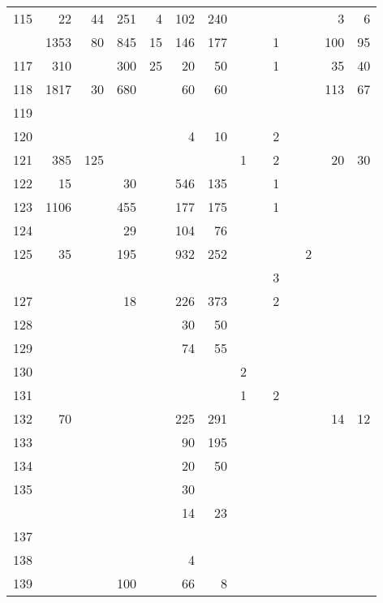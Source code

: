 \documentclass[
]{article}
\begin{document}
\begin{longtable}[l]{rrrrrrrrrrrrrr}
\rowcolor{lightgray}  115 & 22 & 44 & 251 & 4 & 102 & 240 &  &  &  &  &  & 3 & 6\\
\addlinespace
116 & 1353 & 80 & 845 & 15 & 146 & 177 &  &  & 1 &  &  & 100 & 95\\
\rowcolor{lightgray}  117 & 310 &  & 300 & 25 & 20 & 50 &  &  & 1 &  &  & 35 & 40\\
118 & 1817 & 30 & 680 &  & 60 & 60 &  &  &  &  &  & 113 & 67\\
\rowcolor{lightgray}  119 &  &  &  &  &  &  &  &  &  &  &  &  & \\
120 &  &  &  &  & 4 & 10 &  &  & 2 &  &  &  & \\
\addlinespace
\rowcolor{lightgray}  121 & 385 & 125 &  &  &  &  & 1 &  & 2 &  &  & 20 & 30\\
122 & 15 &  & 30 &  & 546 & 135 &  &  & 1 &  &  &  & \\
\rowcolor{lightgray}  123 & 1106 &  & 455 &  & 177 & 175 &  &  & 1 &  &  &  & \\
124 &  &  & 29 &  & 104 & 76 &  &  &  &  &  &  & \\
\rowcolor{lightgray}  125 & 35 &  & 195 &  & 932 & 252 &  &  &  &  & 2 &  & \\
\addlinespace
126 &  &  &  &  &  &  &  &  & 3 &  &  &  & \\
\rowcolor{lightgray}  127 &  &  & 18 &  & 226 & 373 &  &  & 2 &  &  &  & \\
128 &  &  &  &  & 30 & 50 &  &  &  &  &  &  & \\
\rowcolor{lightgray}  129 &  &  &  &  & 74 & 55 &  &  &  &  &  &  & \\
130 &  &  &  &  &  &  & 2 &  &  &  &  &  & \\
\addlinespace
\rowcolor{lightgray}  131 &  &  &  &  &  &  & 1 &  & 2 &  &  &  & \\
132 & 70 &  &  &  & 225 & 291 &  &  &  &  &  & 14 & 12\\
\rowcolor{lightgray}  133 &  &  &  &  & 90 & 195 &  &  &  &  &  &  & \\
134 &  &  &  &  & 20 & 50 &  &  &  &  &  &  & \\
\rowcolor{lightgray}  135 &  &  &  &  & 30 &  &  &  &  &  &  &  & \\
\addlinespace
136 &  &  &  &  & 14 & 23 &  &  &  &  &  &  & \\
\rowcolor{lightgray}  137 &  &  &  &  &  &  &  &  &  &  &  &  & \\
138 &  &  &  &  & 4 &  &  &  &  &  &  &  & \\
\rowcolor{lightgray}  139 &  &  & 100 &  & 66 & 8 &  &  &  &  &  &  & \\

\end{longtable}
\end{document}
